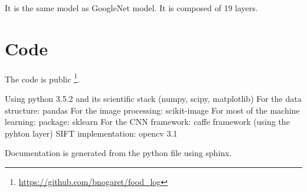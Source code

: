 It is the same model as GoogleNet model. It is composed of 19 layers.

\section{Code}

The code is public \footnote{\url{https://github.com/bnogaret/food_log}}.

Using python 3.5.2 and its scientific stack (numpy, scipy, matplotlib)
For the data structure: pandas \cite{McKinney2010}
For the image processing: scikit-image \cite{VanderWalt2014}
For most of the machine learning: package: sklearn \cite{Pedregosa2012}
For the CNN framework: caffe framework \cite{Jia2014a} (using the pyhton layer)
SIFT implementation: opencv 3.1 \cite{Bradski2000}

Documentation is generated from the python file using sphinx.